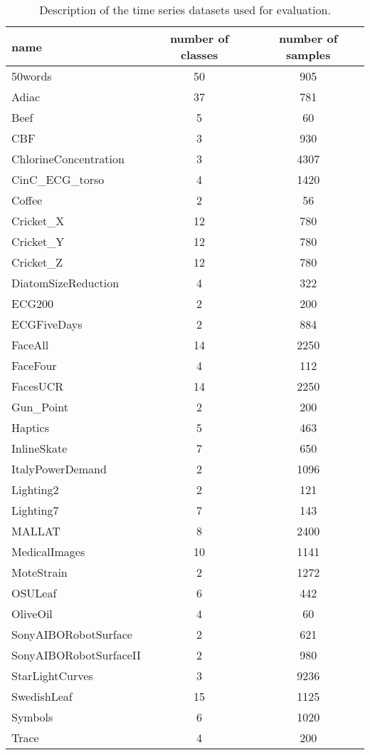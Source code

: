 \documentclass[10pt,letterpaper]{article}
\begin{document}
\begin{table} [h!]
\begin{center}
\caption{Description of the time series datasets used for evaluation.}
\label{didtNoda1}
\small
 \setlength{\tabcolsep}{.16667em}
\begin{tabular}{lcc}
name & number of classes & number of samples \\
\hline
50words & 50 &  905 \\
Adiac & 37 &  781 \\
Beef &  5 &   60 \\
CBF  &  3 &  930 \\
ChlorineConcentration  &  3 & 4307 \\
CinC\_ECG\_torso  &  4 & 1420 \\
Coffee  &  2 &   56 \\
Cricket\_X  & 12 &  780 \\
Cricket\_Y  & 12 &  780 \\
Cricket\_Z  & 12 &  780 \\
DiatomSizeReduction  &  4 &  322 \\
ECG200  &  2 &  200 \\
ECGFiveDays  &  2 &  884 \\
FaceAll &  14 & 2250 \\
FaceFour &   4 &  112 \\
FacesUCR &  14 & 2250 \\
Gun\_Point &   2 &  200 \\
Haptics &   5 &  463 \\
InlineSkate  &  7 &  650 \\
ItalyPowerDemand  &  2 & 1096 \\
Lighting2  &  2 &  121 \\
Lighting7  &  7 &  143 \\
MALLAT  &  8 & 2400 \\
MedicalImages  & 10 & 1141 \\
MoteStrain  &  2 & 1272 \\
OSULeaf &   6 &  442 \\
OliveOil &   4 &   60 \\
SonyAIBORobotSurface &   2 &  621 \\
SonyAIBORobotSurfaceII &   2 &  980 \\
StarLightCurves  &  3 & 9236 \\
SwedishLeaf & 15 & 1125 \\
Symbols  &  6 & 1020 \\
Trace &   4 &  200 \\

\end{tabular}
\end{center}
\end{table}
\end{document}
